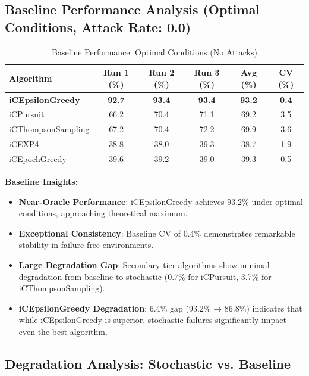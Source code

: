 \documentclass[12pt,a4paper]{article}
\newcommand{\primarytext}[1]{\textcolor{primaryblue}{\textbf{#1}}}
\newcommand{\secondarytext}[1]{\textcolor{secondaryblue}{\textbf{#1}}}
\newcommand{\warning}[1]{\textcolor{warningred}{\textbf{#1}}}
\begin{document}
\subsection{Baseline Performance Analysis (Optimal Conditions, Attack Rate: 0.0)}

\begin{table}[H]
\centering
\caption{Baseline Performance: Optimal Conditions (No Attacks)}
\label{tab:baseline-performance}
\begin{tabular}{@{}lccccc@{}}
\toprule
\textbf{Algorithm} & \textbf{Run 1 (\%)} & \textbf{Run 2 (\%)} & \textbf{Run 3 (\%)} & \textbf{Avg (\%)} & \textbf{CV (\%)} \\
\midrule
\primarytext{iCEpsilonGreedy}   & \primarytext{92.7} & \primarytext{93.4} & \primarytext{93.4} & \primarytext{93.2} & \primarytext{0.4} \\
iCPursuit                       & 66.2 & 70.4 & 71.1 & 69.2 & 3.5 \\
iCThompsonSampling              & 67.2 & 70.4 & 72.2 & 69.9 & 3.6 \\
iCEXP4                          & 38.8 & 38.0 & 39.3 & 38.7 & 1.9 \\
iCEpochGreedy                   & 39.6 & 39.2 & 39.0 & 39.3 & 0.5 \\
\bottomrule
\end{tabular}
\end{table}

\textbf{Baseline Insights:}
\begin{itemize}
\item \primarytext{Near-Oracle Performance}: iCEpsilonGreedy achieves 93.2\% under optimal conditions, approaching theoretical maximum.
\item \primarytext{Exceptional Consistency}: Baseline CV of 0.4\% demonstrates remarkable stability in failure-free environments.
\item \secondarytext{Large Degradation Gap}: Secondary-tier algorithms show minimal degradation from baseline to stochastic (0.7\% for iCPursuit, 3.7\% for iCThompsonSampling).
\item \warning{iCEpsilonGreedy Degradation}: 6.4\% gap (93.2\% → 86.8\%) indicates that while iCEpsilonGreedy is superior, stochastic failures significantly impact even the best algorithm.
\end{itemize}

\subsection{Degradation Analysis: Stochastic vs. Baseline}
\end{document}
